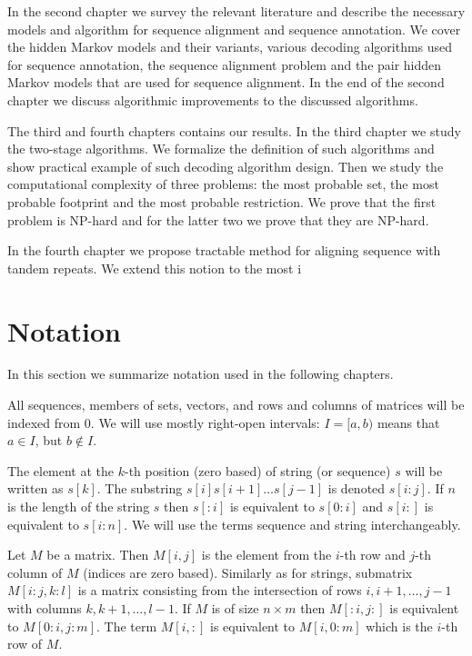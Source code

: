In the second chapter we survey the relevant literature and describe the
necessary models and algorithm for sequence alignment and sequence annotation.
We cover the hidden Markov models and their variants, various decoding
algorithms used for sequence annotation, the sequence alignment problem and the
pair hidden Markov models that are used for sequence alignment.  In the end of
the second chapter we discuss algorithmic improvements to the discussed
algorithms.

The third and fourth chapters contains our results. In the third chapter we
study the two-stage algorithms. We formalize the definition of such algorithms
and show practical example of such decoding algorithm design. Then we study the
computational complexity of three problems: the most probable set, the most
probable footprint and the most probable restriction. We prove that the first
problem is NP-hard and for the latter two we prove that they are NP-hard. 

In the fourth chapter we propose tractable method for aligning sequence with
tandem repeats. We extend this notion to the most i

\section{Notation}

In this section we summarize notation used in the following
chapters.

All sequences, members of sets, vectors, and rows and columns of matrices will
be indexed from $0$. We will use mostly right-open intervals: $I=[a,b)$ means
that $a\in I$, but $b\notin I$. 

The element at the $k$-th position (zero based) of string (or sequence) $s$ will
be written as $s[k]$. The substring $s[i]s[i+1]\dots s[j-1]$ is denoted
$s[i:j]$.  If $n$ is the length of the string $s$ then $s[:i]$ is equivalent to
$s[0:i]$ and $s[i:]$ is equivalent to $s[i:n]$.  We will use the terms sequence
and string interchangeably.

Let $M$ be a matrix. Then $M[i,j]$ is the element from the $i$-th row and $j$-th
column of $M$ (indices are zero based). Similarly as for strings, submatrix
$M[i:j,k:l]$ is a matrix consisting from the intersection of rows $i,i+1,\dots,
j-1$ with columns $k,k+1,\dots,l-1$. If $M$ is of size $n\times m$ then
$M[:i,j:]$ is equivalent to $M[0:i,j:m]$.  The term $M[i,:]$ is equivalent to
$M[i,0:m]$ which is the $i$-th row of $M$.
